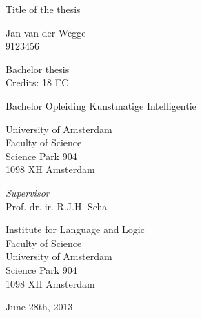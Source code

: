 \documentclass[a4paper,pdf]{article}
\begin{document}
\begin{center}

\vspace{2.5cm}

\begin{Huge}
Title of the thesis
\end{Huge}

\vspace{1.5cm}

Jan van der Wegge\\
9123456

\vspace{1.5cm}

Bachelor thesis\\
Credits: 18 EC

\vspace{0.5cm}

Bachelor Opleiding Kunstmatige Intelligentie

\vspace{0.25cm}

University of Amsterdam\\
Faculty of Science\\
Science Park 904\\
1098 XH Amsterdam

\vspace{4cm}

\emph{Supervisor}\\
Prof. dr. ir. R.J.H. Scha

\vspace{0.25cm}

Institute for Language and Logic\\
Faculty of Science\\
University of Amsterdam\\
Science Park 904\\
1098 XH  Amsterdam

\vspace{1.5cm}

June 28th, 2013

\end{center}
\end{document}
